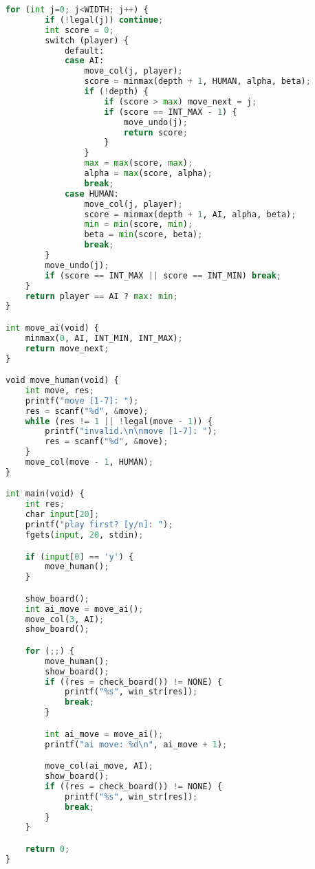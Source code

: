 \documentclass[11pt,letterpaper]{article}
\begin{document}
\begin{lstlisting}[language=Python]
    for (int j=0; j<WIDTH; j++) {
        if (!legal(j)) continue;
        int score = 0;
        switch (player) {
            default:
            case AI:
                move_col(j, player);
                score = minmax(depth + 1, HUMAN, alpha, beta);
                if (!depth) {
                    if (score > max) move_next = j;
                    if (score == INT_MAX - 1) {
                        move_undo(j);
                        return score;
                    }
                }
                max = max(score, max);
                alpha = max(score, alpha);
                break;
            case HUMAN:
                move_col(j, player);
                score = minmax(depth + 1, AI, alpha, beta);
                min = min(score, min);
                beta = min(score, beta);
                break;
        }
        move_undo(j);
        if (score == INT_MAX || score == INT_MIN) break;
    }
    return player == AI ? max: min;
}

int move_ai(void) {
    minmax(0, AI, INT_MIN, INT_MAX);
    return move_next;
}

void move_human(void) {
    int move, res;
    printf("move [1-7]: ");
    res = scanf("%d", &move);
    while (res != 1 || !legal(move - 1)) {
        printf("invalid.\n\nmove [1-7]: ");
        res = scanf("%d", &move);
    }
    move_col(move - 1, HUMAN);
}

int main(void) {
    int res;
    char input[20];
    printf("play first? [y/n]: ");
    fgets(input, 20, stdin);

    if (input[0] == 'y') {
        move_human();
    }

    show_board();
    int ai_move = move_ai();
    move_col(3, AI);
    show_board();

    for (;;) {
        move_human();
        show_board();
        if ((res = check_board()) != NONE) {
            printf("%s", win_str[res]);
            break;
        }

        int ai_move = move_ai();
        printf("ai move: %d\n", ai_move + 1);

        move_col(ai_move, AI);
        show_board();
        if ((res = check_board()) != NONE) {
            printf("%s", win_str[res]);
            break;
        }
    }

    return 0;
}
\end{lstlisting}
\end{document}
